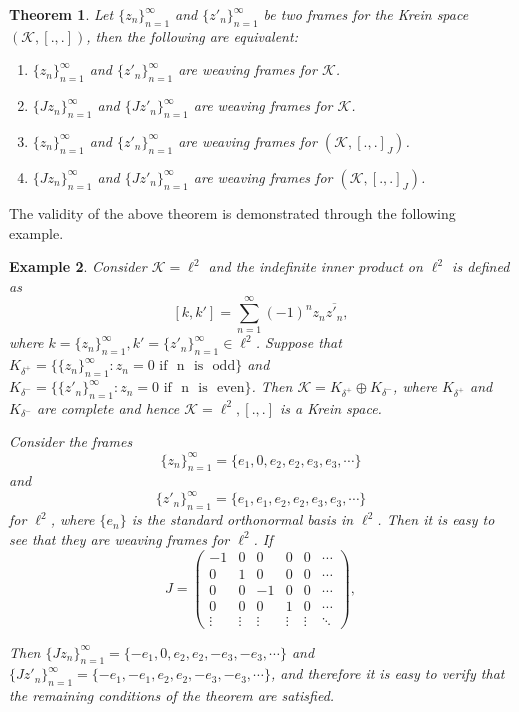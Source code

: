 \documentclass[article,12pt]{amsart}
\newtheorem{thm}{Theorem}[section]
\newtheorem{ex}[thm]{Example}
\begin{document}
\begin{thm}\label{char}
Let $\{z_n\}_{n=1}^\infty$ and $\{z'_n\}_{n=1}^\infty$ be two frames for the Krein space $(\mathcal K, [.,.])$, then the following are equivalent:

\begin{enumerate}
\item $\{z_n\}_{n=1}^\infty$ and $\{z'_n\}_{n=1}^\infty$ are weaving frames for $\mathcal K$.
\item $\{Jz_n\}_{n=1}^\infty$ and $\{Jz'_n\}_{n=1}^\infty$ are weaving frames for $\mathcal K$.
\item $\{z_n\}_{n=1}^\infty$ and $\{z'_n\}_{n=1}^\infty$ are weaving frames for $(\mathcal K, [.,.]_J)$.
\item $\{Jz_n\}_{n=1}^\infty$ and $\{Jz'_n\}_{n=1}^\infty$ are weaving frames for $(\mathcal K, [.,.]_J)$.
\end{enumerate}
\end{thm}

The validity of the above theorem is demonstrated through the following example.

\begin{ex}
Consider $\mathcal K = \ell^2$ and the indefinite inner product on $\ell^2$ is defined as
$$
[k,k']=\sum\limits_{n=1}^\infty (-1)^n z_n \overline{z'_n},
$$ where $k=\{z_n\}_{n=1}^\infty, k'=\{z'_n\}_{n=1}^\infty \in \ell^2$. Suppose that $K_{\delta^+} = \{\{z_n\}_{n=1}^\infty: z_n=0 \text{~if ~n ~is~ odd}\}$ and $K_{\delta^-} = \{\{z'_n\}_{n=1}^\infty: z_n=0 \text{~if ~n ~is~ even}\}$. Then $\mathcal K = K_{\delta^+} \oplus  K_{\delta^-}$, where $K_{\delta^+}$ and $K_{\delta^-}$ are complete and hence $\mathcal K = \ell^2, [.,.]$ is a Krein space. 

Consider the frames 
$$
\{z_n\}_{n=1}^\infty=\{e_1, 0, e_2, e_2, e_3, e_3, \cdots\}
$$ and 
$$
\{z'_n\}_{n=1}^\infty=\{e_1, e_1, e_2, e_2, e_3, e_3, \cdots\}
$$ for $\ell^2$, where $\{e_n\}$ is the standard orthonormal basis in $\ell^2$. Then it is easy to see that they are weaving frames for $\ell^2$. If 
$$
J=\begin{pmatrix}
-1 & 0 & 0 & 0 & 0 & \cdots\\
0 & 1 & 0 & 0 & 0 & \cdots\\
0 & 0 & -1 & 0 & 0 & \cdots\\
0 & 0 & 0 & 1 & 0 & \cdots\\
 \vdots & \vdots & \vdots & \vdots & \vdots & \ddots
\end{pmatrix},
$$

Then $\{Jz_n\}_{n=1}^\infty = \{-e_1, 0, e_2, e_2, -e_3, -e_3, \cdots\}$ and \\
$\{Jz'_n\}_{n=1}^\infty = \{-e_1, -e_1, e_2, e_2, -e_3, -e_3, \cdots\}$, and therefore it is easy to verify that the remaining conditions of the theorem are satisfied.
\end{ex}
\end{document}

